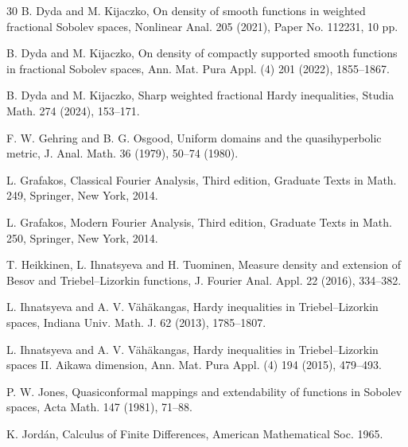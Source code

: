 \documentclass[11pt,twoside]{article}
\theoremstyle{mylem}
\theoremstyle{definition}
\numberwithin{equation}{section}
\begin{document}
\begin{thebibliography}{30}
\vspace{-0.3cm}
B. Dyda and M. Kijaczko, On density of smooth functions in weighted fractional Sobolev spaces, Nonlinear Anal. 205 (2021), Paper No. 112231, 10 pp.

\vspace{-0.3cm}
B. Dyda and M. Kijaczko, On density of compactly supported smooth functions in fractional Sobolev spaces, Ann. Mat. Pura Appl. (4) 201 (2022), 1855--1867.

\vspace{-0.3cm}
B. Dyda and M. Kijaczko, Sharp weighted fractional Hardy inequalities, Studia Math. 274 (2024), 153--171.

\vspace{-0.3cm}
F. W. Gehring and B. G. Osgood, Uniform domains and the quasihyperbolic metric, J. Anal. Math. 36 (1979), 50--74 (1980).

\vspace{-0.3cm}
L. Grafakos, Classical Fourier Analysis, Third edition, Graduate Texts in Math. 249, Springer, New York, 2014.

\vspace{-0.3cm}
L. Grafakos, Modern Fourier Analysis, Third edition, Graduate Texts in Math. 250, Springer, New York, 2014.

\vspace{-0.3cm}
T. Heikkinen, L. Ihnatsyeva and H. Tuominen, Measure density and extension of Besov and Triebel--Lizorkin functions, J. Fourier Anal. Appl. 22 (2016), 334--382.

\vspace{-0.3cm}
L. Ihnatsyeva and A. V. V\"{a}h\"{a}kangas, Hardy inequalities in Triebel--Lizorkin spaces, Indiana Univ. Math. J. 62 (2013), 1785--1807.

\vspace{-0.3cm}
L. Ihnatsyeva and A. V. V\"{a}h\"{a}kangas, Hardy inequalities in Triebel--Lizorkin spaces II. Aikawa dimension, Ann. Mat. Pura Appl. (4) 194 (2015), 479--493.

\vspace{-0.3cm}
P. W. Jones, Quasiconformal mappings and extendability of functions in Sobolev spaces, Acta Math. 147 (1981), 71--88.

\vspace{-0.3cm}
K. Jord\'an, Calculus of Finite Differences, American Mathematical Soc. 1965.


\end{thebibliography}
\end{document}
